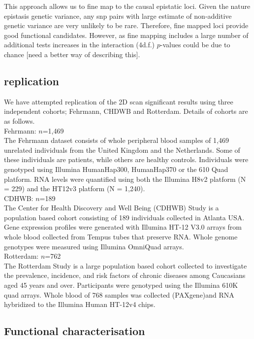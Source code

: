 \documentclass[paper=a4, fontsize=11pt]{scrartcl}	%
\numberwithin{equation}{section}									%
\numberwithin{figure}{section}										%
\numberwithin{table}{section}										%
\begin{document}
This approach allows us to fine map to the causal epistatic loci. Given the nature epistasis genetic variance, any snp pairs with large estimate of non-additive genetic variance are very unlikely to be rare. Therefore, fine mapped loci provide good functional candidates. However, as fine mapping includes a large number of additional tests increases in the interaction (4d.f.) $p$-values could be due to chance [need a better way of describing this].      


\subsection{replication}  

We have attempted replication of the 2D scan significant results using three independent cohorts; Fehrmann, CHDWB and Rotterdam. Details of cohorts are as follows. \\[0.1cm]  

Fehrmann: $n$=1,469 \\[0.1cm]
The Fehrmann dataset consists of whole peripheral blood samples of 1,469 unrelated individuals from the United Kingdom and the Netherlands. Some of these individuals are patients, while others are healthy controls. Individuals were genotyped using Illumina HumanHap300, HumanHap370 or the 610 Quad platform. RNA levels were quantified using both the Illumina H8v2 platform (N = 229) and the HT12v3 platform (N = 1,240). \\[0.1cm]

CDHWB: $n$=189 \\ [0.1cm]
The Center for Health Discovery and Well Being (CDHWB) Study is a population based cohort consisting of 189 individuals collected in Atlanta USA. Gene expression profiles were generated with Illumina HT-12 V3.0 arrays from whole blood collected from Tempus tubes that preserve RNA. Whole genome genotypes were measured using Illumina OmniQuad arrays. \\[0.1cm]

Rotterdam: $n$=762 \\[0.1cm]
The Rotterdam Study is a large population based cohort collected to investigate the prevalence, incidence, and risk factors of chronic diseases among  Caucasians aged 45 years and over. Participants were genotyped using the Illumina 610K quad arrays. Whole blood of 768 samples was collected (PAXgene)and RNA hybridized to the Illumina Human HT-12v4 chips.

\subsection{Functional characterisation}
\end{document}
